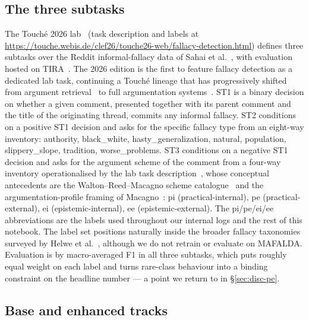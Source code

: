 \subsection{The three subtasks}
\label{sec:task-subtasks}

The Touch\'{e} 2026 lab~\cite{heinrich2026touche} (task description and labels at \url{https://touche.webis.de/clef26/touche26-web/fallacy-detection.html}) defines three subtasks over the Reddit informal-fallacy data of Sahai et al.~\cite{sahai2021invisiblewall}, with evaluation hosted on TIRA~\cite{frobe2023tira}. The 2026 edition is the first to feature fallacy detection as a dedicated lab task, continuing a Touch\'{e} lineage that has progressively shifted from argument retrieval~\cite{bondarenko2022touche,bondarenko2023touche} to full argumentation systems~\cite{kiesel2024touche,kiesel2025touche}. ST1 is a binary decision on whether a given comment, presented together with its parent comment and the title of the originating thread, commits any informal fallacy. ST2 conditions on a positive ST1 decision and asks for the specific fallacy type from an eight-way inventory: \textsf{authority}, \textsf{black\_white}, \textsf{hasty\_generalization}, \textsf{natural}, \textsf{population}, \textsf{slippery\_slope}, \textsf{tradition}, \textsf{worse\_problems}. ST3 conditions on a negative ST1 decision and asks for the argument scheme of the comment from a four-way inventory operationalised by the lab task description~\cite{heinrich2026touche}, whose conceptual antecedents are the Walton--Reed--Macagno scheme catalogue~\cite{walton2008schemes} and the argumentation-profile framing of Macagno~\cite{macagno2022argumentation}: \textsf{pi} (practical-internal), \textsf{pe} (practical-external), \textsf{ei} (epistemic-internal), \textsf{ee} (epistemic-external). The \textsf{pi}/\textsf{pe}/\textsf{ei}/\textsf{ee} abbreviations are the labels used throughout our internal logs and the rest of this notebook. The label set positions naturally inside the broader fallacy taxonomies surveyed by Helwe et al.~\cite{helwe2024mafalda}, although we do not retrain or evaluate on MAFALDA. Evaluation is by macro-averaged F1 in all three subtasks, which puts roughly equal weight on each label and turns rare-class behaviour into a binding constraint on the headline number --- a point we return to in \S\ref{sec:disc-pe}.

\subsection{Base and enhanced tracks}
\label{sec:task-tracks}

